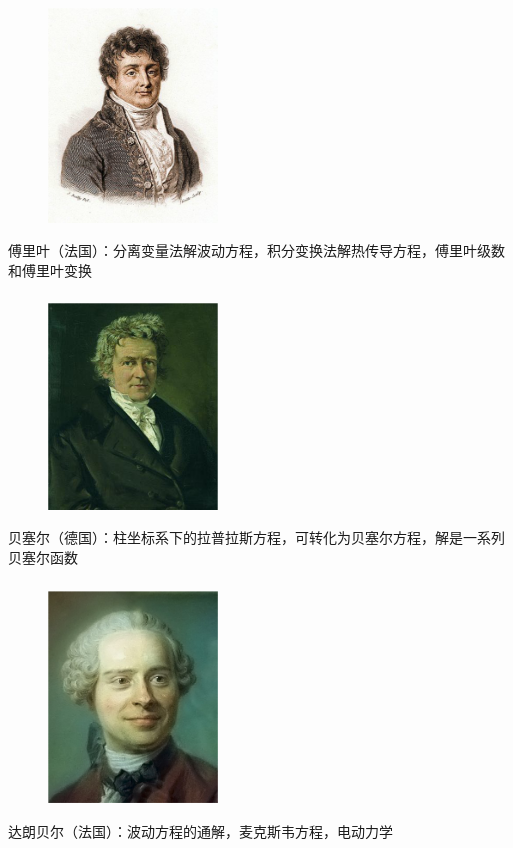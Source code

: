 \begin{frame}
	\frametitle{}
	\begin{center}
		\begin{figure}
			\includegraphics[width=4.5cm]{figs/fig1-3-3.png}	
		\end{figure}
	\end{center}
	{傅里叶（法国）：分离变量法解波动方程，积分变换法解热传导方程，傅里叶级数和傅里叶变换}
\end{frame}

\begin{frame}
	\frametitle{}
	\begin{center}
		\begin{figure}
			\includegraphics[width=4.5cm]{figs/fig1-3-6.png}	
		\end{figure}
	\end{center}
	{贝塞尔（德国）：柱坐标系下的拉普拉斯方程，可转化为贝塞尔方程，解是一系列贝塞尔函数}
\end{frame}

\begin{frame}
	\frametitle{}
	\begin{center}
		\begin{figure}
			\includegraphics[width=4.5cm]{figs/fig1-3-7.png}	
		\end{figure}
	\end{center}
	{达朗贝尔（法国）：波动方程的通解，麦克斯韦方程，电动力学}
\end{frame}

